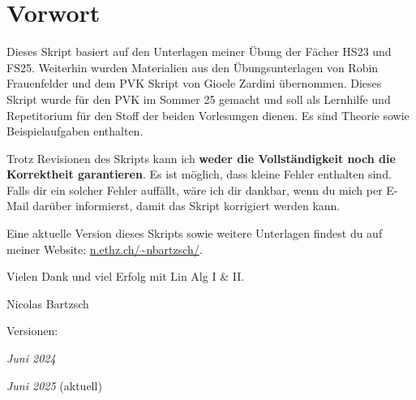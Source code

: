 \setcounter{section}{-1}
\section{Vorwort}
Dieses Skript basiert auf den Unterlagen meiner Übung der Fächer  HS23 und  FS25. Weiterhin wurden Materialien aus den Übungsunterlagen von Robin Frauenfelder und dem PVK Skript von Gioele Zardini übernommen. Dieses Skript wurde für den PVK im Sommer 25 gemacht und soll als Lernhilfe und Repetitorium für den Stoff der beiden Vorlesungen dienen. Es sind Theorie sowie Beispielaufgaben enthalten.

\vspace{1\baselineskip}

Trotz Revisionen des Skripts kann ich \textbf{weder die Vollständigkeit noch die Korrektheit garantieren}. Es ist möglich, dass kleine Fehler enthalten sind. Falls dir ein solcher Fehler auffällt, wäre ich dir dankbar, wenn du mich per E-Mail darüber informierst, damit das Skript korrigiert werden kann.

\vspace{1\baselineskip}

Eine aktuelle Version dieses Skripts sowie weitere Unterlagen findest du auf meiner Website: \url{n.ethz.ch/~nbartzsch/}.

\vspace{1\baselineskip}

Vielen Dank und viel Erfolg mit Lin Alg I \& II.

\vspace{2\baselineskip}

Nicolas Bartzsch 

\vspace{4\baselineskip}

Versionen:

\hspace{1em} \textit{Juni 2024}

\hspace{1em} \textit{Juni 2025} (aktuell)
    